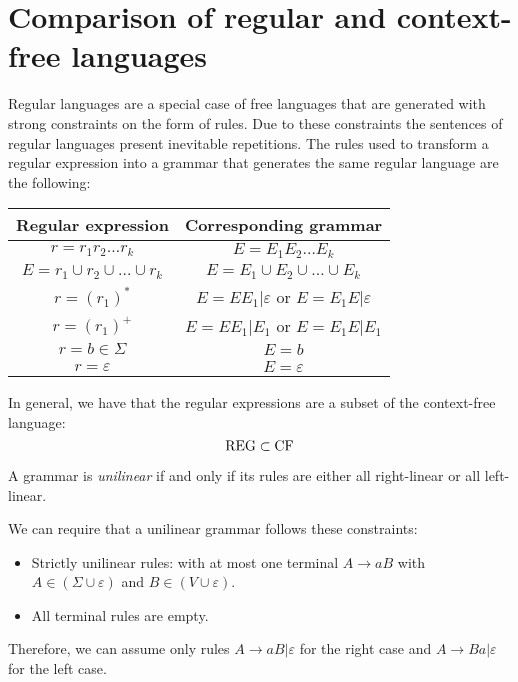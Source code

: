 \section{Comparison of regular and context-free languages}

Regular languages are a special case of free languages that are generated with strong constraints on the form of rules. 
Due to these constraints the sentences of regular languages present inevitable repetitions. 
The rules used to transform a regular expression into a grammar that generates the same regular language are the following: 
\begin{table}[H]
    \centering
    \begin{tabular}{cc}
    \hline
    \textbf{Regular expression}         & \textbf{Corresponding grammar}                \\ \hline
    $r=r_1r_2\dots r_k$                 & $E=E_1E_2 \dots E_k$                          \\ 
    $E=r_1\cup r_2\cup \dots\cup r_k$   & $E=E_1 \cup E_2 \cup \dots \cup E_k$          \\
    $r=(r_1)^{*}$                       & $E=EE_1|\varepsilon$ or $E=E_1E|\varepsilon$  \\
    $r=(r_1)^{+}$                       & $E=EE_1|E_1$ or $E=E_1E|E_1$                  \\
    $r = b \in \Sigma$                  & $E=b$                                         \\
    $r=\varepsilon$                     & $E=\varepsilon$                               \\ \hline
    \end{tabular}
\end{table}

In general, we have that the regular expressions are a subset of the context-free language: 
\[\textnormal{REG} \subset \textnormal{CF}\] 

\begin{definition}
    A grammar is \emph{unilinear} if and only if its rules are either all right-linear or all left-linear. 
\end{definition}
We can require that a unilinear grammar follows these constraints: 
\begin{itemize}
    \item Strictly unilinear rules: with at most one terminal $A \rightarrow aB$ with $A \in (\Sigma \cup \varepsilon)$ and $B \in (V \cup \varepsilon)$. 
    \item All terminal rules are empty. 
\end{itemize}
Therefore, we can assume only rules $A \rightarrow aB|\varepsilon$ for the right case and $A \rightarrow Ba|\varepsilon$ for the left case. 

